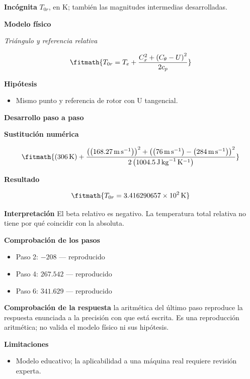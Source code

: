 \documentclass[10pt,openany]{book}
\begin{document}
\noindent\textbf{Incógnita}
$T_{0r}$, en $\mathrm{K}$; también las magnitudes intermedias desarrolladas.

\noindent\textbf{Modelo físico}

\noindent\textit{Triángulo y referencia relativa}

\[
\fitmath{T_{0r}=T_e + \frac{C_x^{2} + \left(C_\theta - U\right)^{2}}{2 c_p}}
\]

\noindent\textbf{Hipótesis}
\begin{itemize}
\item Mismo punto y referencia de rotor con U tangencial.
\end{itemize}

\noindent\textbf{Desarrollo paso a paso}



\noindent\textbf{Sustitución numérica}

\[
\fitmath{\left(306\,\mathrm{K}\right) + \frac{\left(\left(168.27\,\mathrm{m}\,\mathrm{s}^{-1}\right)\right)^{2} + \left(\left(76\,\mathrm{m}\,\mathrm{s}^{-1}\right) - \left(284\,\mathrm{m}\,\mathrm{s}^{-1}\right)\right)^{2}}{2 \left(1004.5\,\mathrm{J}\,\mathrm{kg}^{-1}\,\mathrm{K}^{-1}\right)}}
\]

\noindent\textbf{Resultado}

\[
\fitmath{T_{0r}=3.416290657\times10^{2}\,\mathrm{K}}
\]

\noindent\textbf{Interpretación}
El beta relativo es negativo. La temperatura total relativa no tiene por qué coincidir con la absoluta.

\noindent\textbf{Comprobación de los pasos}
\begin{itemize}
\item Paso 2: $-208$ — reproducido
\item Paso 4: $267.542$ — reproducido
\item Paso 6: $341.629$ — reproducido
\end{itemize}

\noindent\textbf{Comprobación de la respuesta} la aritmética del último paso reproduce la respuesta enunciada a la precisión con que está escrita. Es una reproducción aritmética; no valida el modelo físico ni sus hipótesis.

\noindent\textbf{Limitaciones}
\begin{itemize}
\item Modelo educativo; la aplicabilidad a una máquina real requiere revisión experta.
\end{itemize}
\end{document}
